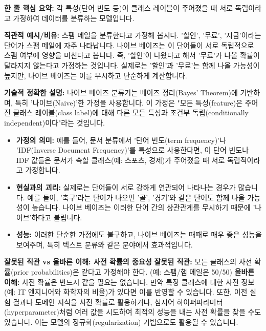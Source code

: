 \documentclass[11pt,a4paper]{article}
\theoremstyle{definition}
\begin{document}
\begin{conceptbox}
\textbf{한 줄 핵심 요약:} 각 특성(단어 빈도 등)이 클래스 레이블이 주어졌을 때 서로 독립이라고 가정하여 데이터를 분류하는 모델입니다.
\end{conceptbox}

\textbf{직관적 예시/비유:}
스팸 메일을 분류한다고 가정해 봅시다. '할인', '무료', '지금'이라는 단어가 스팸 메일에 자주 나타납니다. 나이브 베이즈는 이 단어들이 서로 독립적으로 스팸 여부에 영향을 미친다고 봅니다. 즉, '할인'이 나왔다고 해서 '무료'가 나올 확률이 달라지지 않는다고 가정하는 것입니다. 실제로는 '할인'과 '무료'는 함께 나올 가능성이 높지만, 나이브 베이즈는 이를 무시하고 단순하게 계산합니다.

\textbf{기술적 정확한 설명:}
나이브 베이즈 분류기는 베이즈 정리(Bayes' Theorem)에 기반하며, 특히 '나이브(Naive)'한 가정을 사용합니다. 이 가정은 "모든 특성(feature)은 주어진 클래스 레이블(class label)에 대해 다른 모든 특성과 조건부 독립(conditionally independent)이다"라는 것입니다.

\begin{itemize}
    \item \textbf{가정의 의미:} 예를 들어, 문서 분류에서 '단어 빈도(term frequency)'나 'IDF(Inverse Document Frequency)'를 특성으로 사용한다면, 이 단어 빈도나 IDF 값들은 문서가 속할 클래스(예: 스포츠, 경제)가 주어졌을 때 서로 독립적이라고 가정합니다.
    \item \textbf{현실과의 괴리:} 실제로는 단어들이 서로 강하게 연관되어 나타나는 경우가 많습니다. 예를 들어, '축구'라는 단어가 나오면 '골', '경기'와 같은 단어도 함께 나올 가능성이 높습니다. 나이브 베이즈는 이러한 단어 간의 상관관계를 무시하기 때문에 '나이브'하다고 불립니다.
    \item \textbf{성능:} 이러한 단순한 가정에도 불구하고, 나이브 베이즈는 때때로 매우 좋은 성능을 보여주며, 특히 텍스트 분류와 같은 분야에서 효과적입니다.
\end{itemize}

\begin{warningbox}
\textbf{잘못된 직관 vs 올바른 이해: 사전 확률의 중요성}
\textbf{잘못된 직관:} 모든 클래스의 사전 확률(prior probabilities)은 같다고 가정해야 한다. (예: 스팸/햄 메일은 50/50)
\textbf{올바른 이해:} 사전 확률은 반드시 같을 필요는 없습니다. 만약 특정 클래스에 대한 사전 정보(예: IT 엔지니어와 화학자의 비율)가 있다면 이를 반영할 수 있습니다. 또한, 이전 실험 결과나 도메인 지식을 사전 확률로 활용하거나, 심지어 하이퍼파라미터(hyperparameter)처럼 여러 값을 시도하여 최적의 성능을 내는 사전 확률을 찾을 수도 있습니다. 이는 모델의 정규화(regularization) 기법으로도 활용될 수 있습니다.
\end{warningbox}
\end{document}
